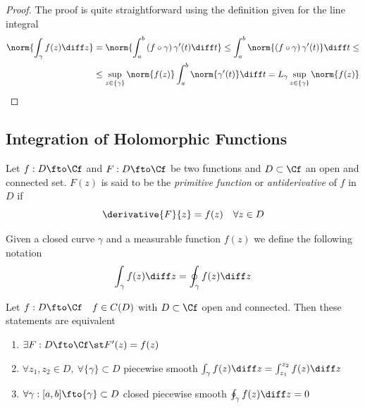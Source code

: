 \documentclass[../mmf.tex]{subfiles}
\begin{document}
\begin{proof}
	The proof is quite straightforward using the definition given for the line integral
	\begin{equation*}
		\begin{aligned}
			\norm{\int_{\gamma}^{}f(z)\diff z}&=\norm{\int_{a}^{b}\left( f\circ\gamma \right)\gamma'(t)\diff t}\le\int_{a}^{b}\norm{\left( f\circ\gamma \right)\gamma'(t)}\diff t\le\\
			&\le\sup_{z\in\{\gamma\}}\norm{f(z)}\int_{a}^{b}\norm{\gamma'(t)}\diff t=L_\gamma\sup_{z\in\{\gamma\}}\norm{f(z)}
		\end{aligned}
	\end{equation*}
\end{proof}
\subsection{Integration of Holomorphic Functions}
\begin{dfn}[Primitive]
	Let $f:D\fto\Cf$ and $F:D\fto\Cf$ be two functions and $D\subset\Cf$ an open and connected set. $F(z)$ is said to be the \textit{primitive function} or \textit{antiderivative} of $f$ in $D$ if
	\begin{equation}
		\derivative{F}{z}=f(z)\quad\forall z\in D
		\label{eq:primitive}
	\end{equation}
\end{dfn}
\begin{ntn}
	Given a closed curve $\gamma$ and a measurable function $f(z)$ we define the following notation
	\begin{equation*}
		\int_\gamma f(z)\diff z=\oint_\gamma f(z)\diff z
	\end{equation*}
\end{ntn}
\begin{thm}
	Let $f:D\fto\Cf\quad f\in C(D)$ with $D\subset\Cf$ open and connected. Then these statements are equivalent
	\begin{enumerate}
	\item $\exists F:D\fto\Cf\st F'(z)=f(z)$
	\item $\forall z_1,z_2\in D,\ \forall\{\gamma\}\subset D$ piecewise smooth $\int_{\gamma}^{}f(z)\diff z=\int_{z_1}^{z_2}f(z)\diff z$
	\item $\forall\gamma:[a,b]\fto\{\gamma\}\subset D$ closed piecewise smooth $\oint_\gamma f(z)\diff z=0$
	\end{enumerate}
\end{thm}
\end{document}
